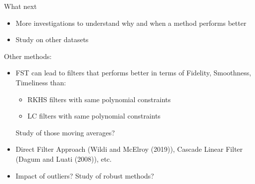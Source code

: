 \documentclass[10pt,xcolor=table,color={dvipsnames,usenames},ignorenonframetext,usepdftitle=false,english]{beamer}
\providecommand{\tightlist}{%
  \setlength{\parskip}{0pt}
  }
\newcommand\1{\mathds{1}}
\begin{document}
\begin{frame}{What next\bcquestion}
\protect\hypertarget{what-next}{}
\begin{itemize}
\tightlist
\item
  More investigations to understand why and when a method performs
  better
\end{itemize}

\pause

\begin{itemize}
\tightlist
\item
  Study on other datasets
\end{itemize}

\pause

Other methods:

\begin{itemize}
\item
  FST can lead to filters that performs better in terms of Fidelity,
  Smoothness, Timeliness than:

  \begin{itemize}
  \item
    RKHS filters with same polynomial constraints
  \item
    LC filters with same polynomial constraints
  \end{itemize}

   Study of those moving averages?
\end{itemize}

\pause

\begin{itemize}
\tightlist
\item
  Direct Filter Approach (Wildi and McElroy (2019)), Cascade Linear
  Filter (Dagum and Luati (2008)), etc.
\end{itemize}

\pause

\begin{itemize}
\tightlist
\item
  Impact of outliers? Study of robust methods?
\end{itemize}
\end{frame}
\end{document}
